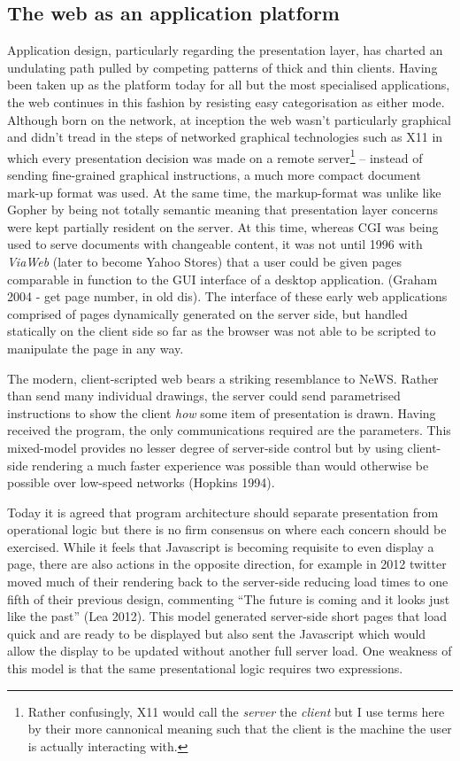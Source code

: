 \documentclass[]{article}
\begin{document}
\subsection{The web as an application platform}

Application design, particularly regarding the presentation layer, has
charted an undulating path pulled by competing patterns of thick and
thin clients. Having been taken up as the platform today for all but the
most specialised applications, the web continues in this fashion by
resisting easy categorisation as either mode. Although born on the
network, at inception the web wasn't particularly graphical and didn't
tread in the steps of networked graphical technologies such as X11 in
which every presentation decision was made on a remote server\footnote{Rather
  confusingly, X11 would call the \emph{server} the \emph{client} but I
  use terms here by their more cannonical meaning such that the client
  is the machine the user is actually interacting with.} -- instead of
sending fine-grained graphical instructions, a much more compact
document mark-up format was used. At the same time, the markup-format
was unlike like Gopher by being not totally semantic meaning that
presentation layer concerns were kept partially resident on the server.
At this time, whereas CGI was being used to serve documents with
changeable content, it was not until 1996 with \emph{ViaWeb} (later to
become Yahoo Stores) that a user could be given pages comparable in
function to the GUI interface of a desktop application. (Graham 2004 -
get page number, in old dis). The interface of these early web
applications comprised of pages dynamically generated on the server
side, but handled statically on the client side so far as the browser
was not able to be scripted to manipulate the page in any way.

The modern, client-scripted web bears a striking resemblance to NeWS.
Rather than send many individual drawings, the server could send
parametrised instructions to show the client \emph{how} some item of
presentation is drawn. Having received the program, the only
communications required are the parameters. This mixed-model provides no
lesser degree of server-side control but by using client-side rendering
a much faster experience was possible than would otherwise be possible
over low-speed networks (Hopkins 1994).

Today it is agreed that program architecture should separate
presentation from operational logic but there is no firm consensus on
where each concern should be exercised. While it feels that Javascript
is becoming requisite to even display a page, there are also actions in
the opposite direction, for example in 2012 twitter moved much of their
rendering back to the server-side reducing load times to one fifth of
their previous design, commenting ``The future is coming and it looks
just like the past'' (Lea 2012). This model generated server-side short
pages that load quick and are ready to be displayed but also sent the
Javascript which would allow the display to be updated without another
full server load. One weakness of this model is that the same
presentational logic requires two expressions.
\end{document}
